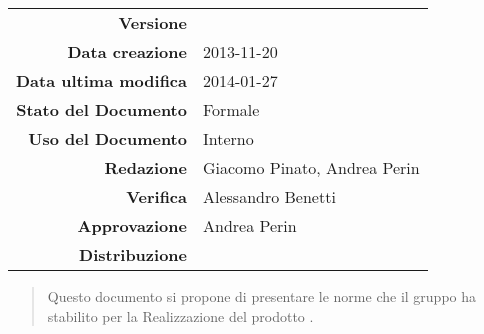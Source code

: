 



\newcommand{\Versione}{\versioneNormeDiProgetto{}}	%
\newcommand{\Data}{2013-11-20}						%
\newcommand{\DataUltimaModifica}{2014-01-27}
\newcommand{\TipoDocumento}{Norme di Progetto}		%


\setcounter{secnumdepth}{5}

\begin{center}
\begin{tabular}{r|l}
\textbf{Versione} & \Versione{} \\
\textbf{Data creazione} & \Data{} \\
\textbf{Data ultima modifica} & \DataUltimaModifica{} \\
\textbf{Stato del Documento} & Formale \\		%
\textbf{Uso del Documento} & Interno \\			%
\textbf{Redazione} & Giacomo Pinato, Andrea Perin\\			%
\textbf{Verifica} & Alessandro Benetti\\			%
\textbf{Approvazione} & Andrea Perin\\				%
\textbf{Distribuzione} & \parbox[t]{4cm}{\NomeGruppo{}}\\
\end{tabular}
\end{center}

\vspace{0.05in}

\begin{abstract}
\begin{center}
Questo documento si propone di presentare le norme che il gruppo \textbf{\NomeGruppo{}} ha stabilito per la Realizzazione del prodotto \textbf{\Progetto{}}.
\end{center}
\end{abstract}

